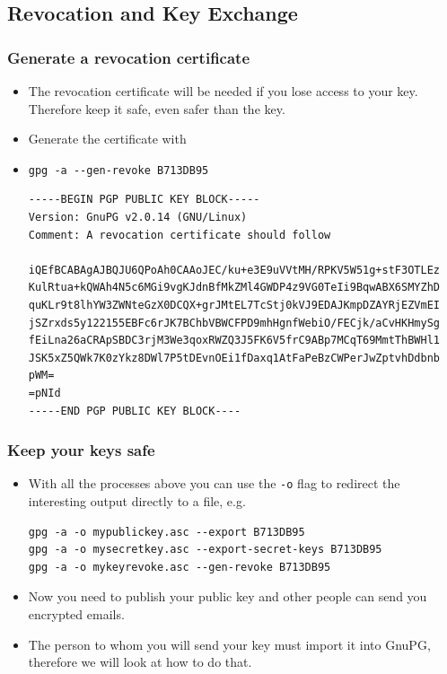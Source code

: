 \documentclass[hyperref={colorlinks=true}]{beamer}
\begin{document}
\subsection{Revocation and Key Exchange}
\begin{frame}[fragile]\frametitle{Generate a revocation certificate}
  \begin{itemize}
    \item The revocation certificate will be needed if you lose access to your
key.  Therefore keep it safe, even safer than the key.
    \item Generate the certificate with
    \item[] \verb|gpg -a --gen-revoke B713DB95|
{\tiny
\begin{verbatim}
-----BEGIN PGP PUBLIC KEY BLOCK-----
Version: GnuPG v2.0.14 (GNU/Linux)
Comment: A revocation certificate should follow

iQEfBCABAgAJBQJU6QPoAh0CAAoJEC/ku+e3E9uVVtMH/RPKV5W51g+stF3OTLEz
KulRtua+kQWAh4N5c6MGi9vgKJdnBfMkZMl4GWDP4z9VG0TeIi9BqwABX6SMYZhD
quKLr9t8lhYW3ZWNteGzX0DCQX+grJMtEL7TcStj0kVJ9EDAJKmpDZAYRjEZVmEI
jSZrxds5y122155EBFc6rJK7BChbVBWCFPD9mhHgnfWebiO/FECjk/aCvHKHmySg
fEiLna26aCRApSBDC3rjM3We3qoxRWZQ3J5FK6V5frC9ABp7MCqT69MmtThBWHl1
JSK5xZ5QWk7K0zYkz8DWl7P5tDEvnOEi1fDaxq1AtFaPeBzCWPerJwZptvhDdbnb
pWM=
=pNId
-----END PGP PUBLIC KEY BLOCK----
\end{verbatim}
}
  \end{itemize}
\end{frame}

\begin{frame}[fragile]\frametitle{Keep your keys safe}
  \begin{itemize}
    \item With all the processes above you can use the \verb|-o| flag to
redirect the interesting output directly to a file, e.g.
{\footnotesize
\begin{verbatim}
gpg -a -o mypublickey.asc --export B713DB95
gpg -a -o mysecretkey.asc --export-secret-keys B713DB95
gpg -a -o mykeyrevoke.asc --gen-revoke B713DB95
\end{verbatim}
}
    \item Now you need to publish your public key and other people can send you
encrypted emails.
    \item The person to whom you will send your key must import it into GnuPG,
therefore we will look at how to do that.
  \end{itemize}
\end{frame}
\end{document}

